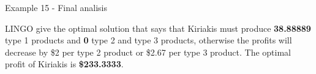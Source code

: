 \begin{frame}{Example 15 - Final analisis}

LINGO give the optimal solution that says that Kiriakis must produce
\textbf{38.88889} type 1 products and \textbf{0} type 2 and type 3 products,
otherwise the profits will decrease by \$2 per type 2 product or \$2.67 per
type 3 product. The optimal profit of Kiriakis is \textbf{\$233.3333}.

\end{frame}
